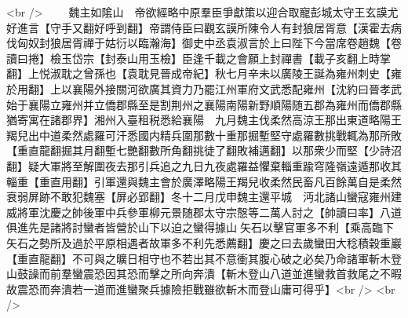 <br />
　　魏主如隂山　帝欲經略中原羣臣爭獻策以迎合取寵彭城太守王玄謨尤好進言【守手又翻好呼到翻】帝謂侍臣曰觀玄謨所陳令人有封狼居胥意【漢霍去病伐匈奴封狼居胥禪于姑衍以臨瀚海】御史中丞袁淑言於上曰陛下今當席卷趙魏【卷讀曰捲】檢玉岱宗【封泰山用玉檢】臣逢千載之會願上封禪書【載子亥翻上時掌翻】上悦淑耽之曾孫也【袁耽見晉成帝紀】秋七月辛未以廣陵王誕為雍州刺史【雍於用翻】上以襄陽外接關河欲廣其資力乃罷江州軍府文武悉配雍州【沈約曰晉孝武始于襄陽立雍州并立僑郡縣至是割荆州之襄陽南陽新野順陽随五郡為雍州而僑郡縣猶寄寓在諸郡界】湘州入臺租税悉給襄陽　九月魏主伐柔然高涼王那出東道略陽王羯兒出中道柔然處羅可汗悉國内精兵圍那數十重那掘塹堅守處羅數挑戰輒為那所敗【重直龍翻掘其月翻塹七艷翻數所角翻挑徒了翻敗補邁翻】以那衆少而堅【少詩沼翻】疑大軍將至解圍夜去那引兵追之九日九夜處羅益懼棄輜重踰穹隆嶺遠遁那收其輜重【重直用翻】引軍還與魏主會於廣澤略陽王羯兒收柔然民畜凡百餘萬自是柔然衰弱屏跡不敢犯魏塞【屏必郢翻】冬十二月戊申魏主還平城　沔北諸山蠻寇雍州建威將軍沈慶之帥後軍中兵參軍柳元景随郡太守宗慤等二萬人討之【帥讀曰率】八道俱進先是諸將討蠻者皆營於山下以迫之蠻得據山矢石以擊官軍多不利【乘高臨下矢石之勢所及過於平原相遇者故軍多不利先悉薦翻】慶之曰去歲蠻田大稔積穀重巖【重直龍翻】不可與之曠日相守也不若出其不意衝其腹心破之必矣乃命諸軍斬木登山鼓譟而前羣蠻震恐因其恐而擊之所向奔潰【斬木登山八道並進蠻救首救尾之不暇故震恐而奔潰若一道而進蠻聚兵據險拒戰雖欲斬木而登山庸可得乎】<br />
<br />

